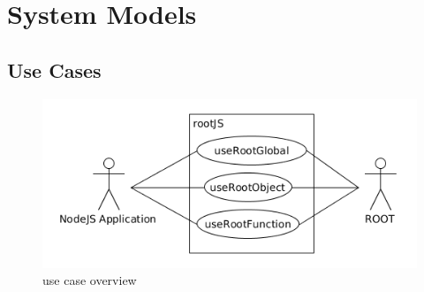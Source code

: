 \chapter{System Models}

\pagebreak[4]

\section{Use Cases}
\begin{figure}[htb]
	\centering
	\includegraphics[width=18cm]{./latex/resources/usecaseOverview.png}
	\caption{use case overview}
\end{figure}

\pagebreak[4]



\pagebreak[4]

